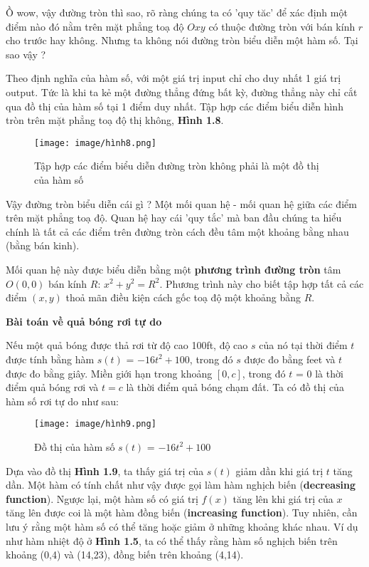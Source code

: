 \documentclass[a4paper,12pt,openany]{book}
\begin{document}
\vspace{10pt}
Ồ wow, vậy đường tròn thì sao, rõ ràng chúng ta có 'quy tăc' để xác định một điểm nào đó nằm trên mặt phẳng toạ độ $Oxy$ có thuộc đường tròn với bán kính $r$ cho trước hay không. Nhưng ta không nói đường tròn biểu diễn một hàm số. Tại sao vậy ?
\par
\vspace{10pt}
Theo định nghĩa của hàm số, với một giá trị input chỉ cho duy nhất 1 giá trị output. Tức là khi ta kẻ một đường thẳng đứng bất kỳ, đường thẳng này chỉ cắt qua đồ thị của hàm số tại 1 điểm duy nhất. Tập hợp các điểm biểu diễn hình tròn trên mặt phẳng toạ độ thị không, \textbf{Hình 1.8}.

\begin{figure}[H]
    \centering
    \texttt{[image: image/hình8.png]}
    \caption{Tập hợp các điểm biểu diễn đường tròn không phải là một đồ thị của hàm số }
    \label{fig:enter-label}
\end{figure}

\clearpage
Vậy đường tròn biểu diễn cái gì ? Một mối quan hệ - mối quan hệ giữa các điểm trên mặt phẳng toạ độ. Quan hệ hay cái 'quy tắc' mà ban đầu chúng ta hiểu chính là tất cả các điểm trên đường tròn cách đều tâm một khoảng bằng nhau (bằng bán kinh). 
\par
\vspace{10pt}
Mối quan hệ này được biểu diễn bằng một \textbf{phương trình đường tròn} tâm $O(0,0)$ bán kính $R$: \(x^2 + y^2 = R^2\). Phương trình này cho biết tập hợp tất cả các điểm $(x,y)$ thoả mãn điều kiện cách gốc toạ độ một khoảng bằng $R$.

\begin{tcolorbox}
    [
    colframe=blue!10,      %
    colback=blue!10,    %
    ]
\textbf{Bài toán về quả bóng rơi tự do}    
\end{tcolorbox}

Nếu một quả bóng được thả rơi từ độ cao 100ft, độ cao $s$ của nó tại thời điểm $t$ được tính bằng hàm $s(t)$ = \(-16t^2 + 100\), trong đó $s$ được đo bằng feet và $t$ được đo bằng giây. Miền giới hạn trong khoảng $[0,c]$, trong đó $t$ = 0 là thời điểm quả bóng rơi và $t = c$ là thời điểm quả bóng chạm đất. Ta có đồ thị của hàm số rơi tự do như sau:

\begin{figure}[H]
    \centering
    \texttt{[image: image/hình9.png]}
    \caption{Đồ thị của hàm số $s(t)$ = \(-16t^2 + 100\) }
    \label{fig:enter-label}
\end{figure}
\vspace{10pt}
Dựa vào đồ thị \textbf{Hình 1.9}, ta thấy giá trị của $s(t)$ giảm dần khi giá trị $t$ tăng dần. Một hàm có tính chất như vậy được gọi làm hàm nghịch biến (\textbf{decreasing function}). Ngược lại, một hàm số có giá trị $f(x)$ tăng lên khi giá trị của $x$ tăng lên được coi là một hàm đồng biến (\textbf{increasing function}). Tuy nhiên, cần lưu ý rằng một hàm số có thể tăng hoặc giảm ở những khoảng khác nhau. Ví dụ như hàm nhiệt độ ở \textbf{Hình 1.5}, ta có thể thấy rằng hàm số nghịch biến trên khoảng (0,4) và (14,23), đồng biến trên khoảng (4,14).
\end{document}
